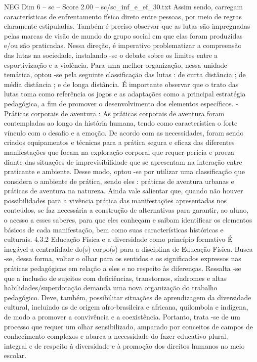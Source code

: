 \begin{textsample}{NEG Dim 6 – sc – Score 2.00 – sc/sc\_inf\_e\_ef\_30.txt}
Assim sendo, carregam características de enfrentamento físico direto entre pessoas, por meio de regras claramente estipuladas.
Também é preciso observar que as lutas são impregnadas pelas marcas de visão de mundo do grupo social em que elas foram produzidas e/ou são praticadas.
Nessa direção, é imperativo problematizar a compreensão das lutas na sociedade, instalando -se o debate sobre os limites entre a esportivização e a violência.
Para uma melhor organização, nessa unidade temática, optou -se pela seguinte classificação das lutas : de curta distância ; de média distância ; e de longa distância.
É importante observar que o trato das lutas toma como referência os jogos e as adaptações como a principal estratégia pedagógica, a fim de promover o desenvolvimento dos elementos específicos. - Práticas corporais de aventura : As práticas corporais de aventura foram contempladas ao longo da história humana, tendo como característica o forte vínculo com o desafio e a emoção.
De acordo com as necessidades, foram sendo criados equipamentos e técnicas para a prática segura e eficaz das diferentes manifestações que focam na exploração corporal que requer perícia e proeza diante das situações de imprevisibilidade que se apresentam na interação entre praticante e ambiente.
Desse modo, optou -se por utilizar uma classificação que considera o ambiente de prática, sendo eles : práticas de aventura urbanas e práticas de aventura na natureza.
Ainda vale salientar que, quando não houver possibilidades para a vivência prática das manifestações apresentadas nos conteúdos, se faz necessária a construção de alternativas para garantir, ao aluno, o acesso a esses saberes, para que eles conheçam e saibam identificar os elementos básicos de cada manifestação, bem como suas características históricas e culturais. 4.3.2 Educação Física e a diversidade como princípio formativo É inegável a centralidade do(s) corpo(s) para a disciplina de Educação Física.
Busca -se, dessa forma, voltar o olhar para os sentidos e os significados expressos nas práticas pedagógicas em relação a eles e no respeito às diferenças.
Ressalta -se que a inclusão de sujeitos com deficiências, transtornos, síndromes e altas habilidades/superdotação demanda uma nova organização do trabalho pedagógico.
Deve, também, possibilitar situações de aprendizagem da diversidade cultural, incluindo as de origem afro-brasileira e africana, quilombola e indígena, de modo a promover a convivência e a coexistência.
Portanto, trata -se de um processo que requer um olhar sensibilizado, amparado por conceitos de campos de conhecimento complexos e abarca a necessidade do fazer educativo plural, integral e de respeito à diversidade e à promoção dos direitos humanos no meio escolar.

\end{textsample}
